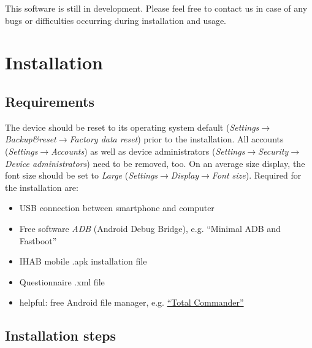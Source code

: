 \documentclass[11pt,a4paper,titlepage]{article}
\begin{document}
This software is still in development. Please feel free to contact us in case of any bugs or difficulties occurring during installation and usage.

\section{Installation}

\subsection{Requirements}

The device should be reset to its operating system default (\textit{Settings}$\rightarrow$\textit{Backup\&reset}$\rightarrow$\textit{Factory data reset}) prior to the installation. All accounts (\textit{Settings}$\rightarrow$\textit{Accounts}) as well as device administrators (\textit{Settings}$\rightarrow$\textit{Security}$\rightarrow$\textit{Device administrators}) need to be removed, too. On an average size display, the font size should be set to \textit{Large} (\textit{Settings}$\rightarrow$\textit{Display}$\rightarrow$\textit{Font size}). Required for the installation are:

\begin{itemize}
	\item USB connection between smartphone and computer
	\item Free software \textit{ADB} (Android Debug Bridge), e.g. ``Minimal ADB and Fastboot''
	\item IHAB mobile .apk installation file
	\item Questionnaire .xml file
	\item helpful: free Android file manager, e.g. \href{https://total-commander.de.uptodown.com/android}{``Total Commander''}
\end{itemize}


\subsection{Installation steps}
\end{document}
